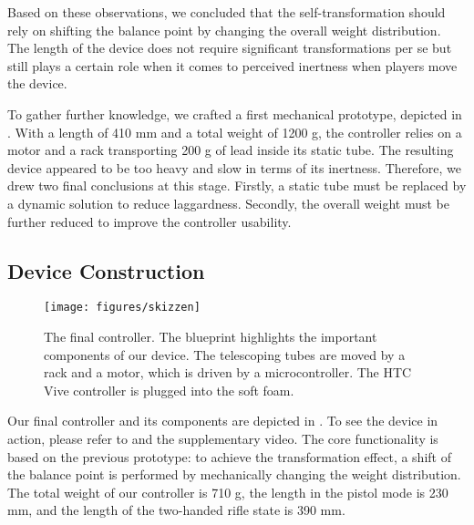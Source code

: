 \documentclass{sigchi}
\begin{document}
Based on these observations, we concluded that the self-transformation should rely on shifting the balance point by changing the overall weight distribution. The length of the device does not require significant transformations per se but still plays a certain role when it comes to perceived inertness when players move the device.


%

To gather further knowledge, we crafted a first mechanical prototype, depicted in . With a length of 410 mm and a total weight of 1200 g, the controller relies on a motor and a rack transporting 200 g of lead inside its static tube. The resulting device appeared to be too heavy and slow in terms of its inertness. Therefore, we drew two final conclusions at this stage. Firstly, a static tube must be replaced by a dynamic solution to reduce laggardness. Secondly, the overall weight must be further reduced to improve the controller usability.


\subsection{Device Construction}

\begin{figure}[t!]
\centering
\texttt{[image: figures/skizzen]}
\caption{The final controller. The blueprint highlights the important components of our device. The telescoping tubes are moved by a rack and a motor, which is driven by a microcontroller. The HTC Vive controller is plugged into the soft foam.}
\label{fig:plan}
\end{figure}

Our final controller and its components are depicted in . To see the device in action, please refer to  and the supplementary video. The core functionality is based on the previous prototype: to achieve the transformation effect, a shift of the balance point is performed by mechanically changing the weight distribution. The total weight of our controller is 710 g, the length in the pistol mode is 230 mm, and the length of the two-handed rifle state is 390 mm.
\end{document}
